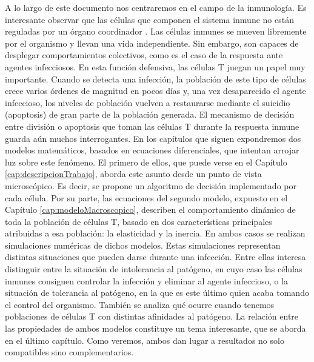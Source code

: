 A lo largo de este documento nos centraremos en el campo de la inmunología. Es interesante observar que las células que componen el sistema inmune no están reguladas por un órgano coordinador \citep{arias2016emergent}. Las células inmunes se mueven libremente por el organismo y llevan una vida independiente. Sin embargo, son capaces de desplegar comportamientos colectivos, como es el caso de la respuesta ante agentes infecciosos. En esta función defensiva, las células T juegan un papel muy importante. Cuando se detecta una infección, la población de este tipo de células crece varios órdenes de magnitud en pocos días y, una vez desaparecido el agente infeccioso, los niveles de población vuelven a restaurarse mediante el suicidio (apoptosis) de gran parte de la población generada. El mecanismo de decisión entre división o apoptosis que toman las células T durante la respuesta inmune guarda aún muchos interrogantes. En los capítulos que siguen expondremos dos modelos matemáticos, basados en ecuaciones diferenciales, que intentan arrojar luz sobre este fenómeno. El primero de ellos, que puede verse en el Capítulo \ref{cap:descripcionTrabajo}, aborda este asunto desde un punto de vista microscópico. Es decir, se propone un algoritmo de decisión implementado por cada célula. Por su parte, las ecuaciones del segundo modelo, expuesto en el Capítulo \ref{cap:modeloMacroscopico}, describen el comportamiento dinámico de toda la población de células T, basado en dos características principales  atribuidas a esa población: la elasticidad y la inercia. En ambos casos se realizan simulaciones numéricas de dichos modelos. Estas simulaciones representan distintas situaciones que pueden darse durante una infección. Entre ellas interesa distinguir entre la situación de intolerancia al patógeno, en cuyo caso las células inmunes consiguen controlar la infección y eliminar al agente infeccioso, o la situación de tolerancia al patógeno, en la que es este último quien acaba tomando el control del organismo. También se analiza qué ocurre cuando tenemos poblaciones de células T con distintas afinidades al patógeno. La relación entre las propiedades de ambos modelos constituye un tema interesante, que se aborda en el último capítulo. Como veremos, ambos dan lugar a resultados no solo compatibles sino complementarios. 



